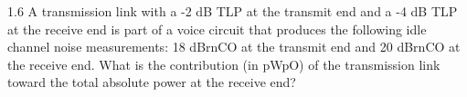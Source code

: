 1.6 A transmission link with a -2 dB TLP at the transmit end and a -4 dB TLP
at the receive end is part of a voice circuit that produces the following
idle channel noise measurements: 18 dBrnCO at the transmit end and 20 dBrnCO
at the receive end. What is the contribution (in pWpO) of the transmission
link toward the total absolute power at the receive end?

